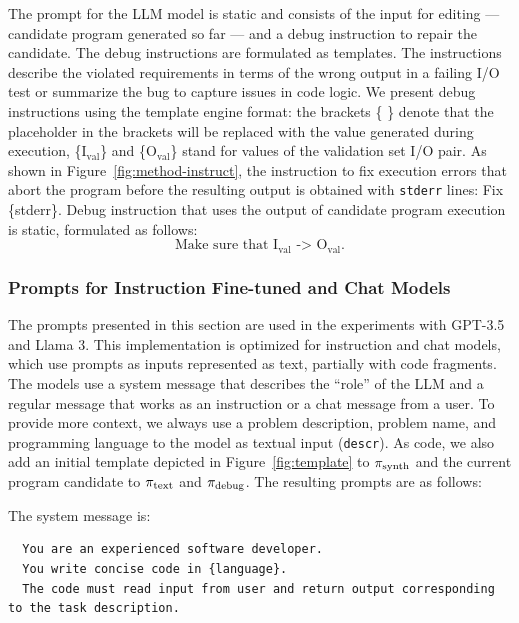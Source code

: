 The prompt for the LLM model is static and consists of the input for editing --- candidate program generated so far --- and a debug instruction to repair the candidate. 
The debug instructions are formulated as templates. The instructions describe the violated requirements in terms of the wrong output in a failing I/O test or summarize the bug to capture issues in code logic.
We present debug instructions using the template engine format: the brackets \{ \} denote that the placeholder in the brackets will be replaced with the value generated during execution, \{I$_{\text{val}}$\} and \{O$_{\text{val}}$\} stand for values of the validation set I/O pair. As shown in Figure~\ref{fig:method-instruct}, the instruction to fix execution errors that abort the program before the resulting output is obtained with \texttt{stderr} lines: Fix \{stderr\}. Debug instruction that uses the output of candidate program execution is static, formulated as follows: 
\begin{equation}\label{seidr:prompt-0} 
    \text{Make sure that I}_{\text{val}} \text{ -> O}_{\text{val}}. \tag{S0}
\end{equation}


\subsubsection{Prompts for Instruction Fine-tuned and Chat Models}
\label{sec:seidr-ollama-prompts}

The prompts presented in this section are used in the experiments with GPT-3.5 and Llama 3.
This implementation is optimized for instruction and chat models, which use prompts as inputs represented as text, partially with code fragments.
The models use a system message that describes the ``role'' of the LLM and a regular message that works as an instruction or a chat message from a user.
To provide more context, we always use a problem description, problem name, and programming language to the model as textual input (\texttt{descr}). 
As code, we also add an initial template depicted in Figure~\ref{fig:template} to $ \pi_\text{synth} $ and the current program candidate to $ \pi_\text{text} $ and $ \pi_\text{debug} $. The resulting prompts are as follows:

The system message is: 
\begin{lstlisting}
  You are an experienced software developer.
  You write concise code in {language}.
  The code must read input from user and return output corresponding to the task description.
\end{lstlisting}

